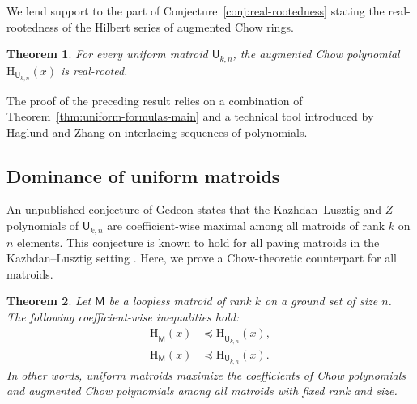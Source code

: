 \documentclass[11pt, a4paper, english]{amsart}
\theoremstyle{teoremas}
\newtheorem{theorem}{Theorem}[section]
\theoremstyle{definition}
\newcommand{\M}{\mathsf{M}}
\newcommand{\U}{\mathsf{U}}
\renewcommand{\H}{\mathrm{H}}
\newcommand{\uH}{\underline{\mathrm{H}}}
\begin{document}
We lend support to the part of Conjecture~\ref{conj:real-rootedness} stating the real-rootedness of the Hilbert series of augmented Chow rings. 

\begin{theorem}\label{thm:intro-hz}
     For every uniform matroid $\U_{k,n}$, the augmented Chow polynomial $\H_{\U_{k,n}}(x)$ is real-rooted.
\end{theorem}

The proof of the preceding result relies on a combination of Theorem~\ref{thm:uniform-formulas-main} and a technical tool introduced by Haglund and Zhang \cite{haglund-zhang} on interlacing sequences of polynomials.


\subsection{Dominance of uniform matroids} 
An unpublished conjecture of Gedeon states that the Kazhdan--Lusztig and $Z$-polynomials of $\U_{k,n}$ are coefficient-wise maximal among all matroids of rank $k$ on $n$ elements. This conjecture is known to hold for all paving matroids in the Kazhdan--Lusztig setting \cite[Theorem~1.5]{ferroni-nasr-vecchi}. Here, we prove a Chow-theoretic counterpart for all matroids.


\begin{theorem}\label{thm:dominance-uniform-main}
    Let $\M$ be a loopless matroid of rank $k$ on a ground set of size $n$. The following coefficient-wise inequalities hold:
    \begin{align*}
        \uH_{\M}(x) &\preceq \uH_{\U_{k,n}}(x),\\
        \H_{\M}(x) &\preceq \H_{\U_{k,n}}(x).
    \end{align*}
    In other words, uniform matroids maximize 
    the coefficients of Chow polynomials and augmented Chow polynomials among all matroids with fixed rank and size.
\end{theorem}
\end{document}
